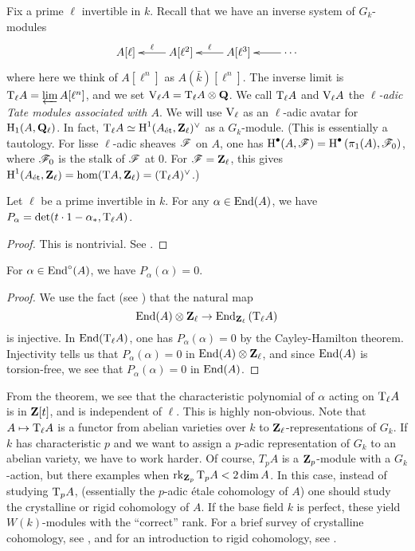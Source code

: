 Fix a prime $\ell$ invertible in $k$. Recall that we have an inverse system of 
$G_k$-modules 
\[\xymatrix{
  A[\ell] 
    & \ar[l]_-\ell A[\ell^2]
    & \ar[l]_-\ell A[\ell^3] 
    & \ar[l] \cdots
}\]
where here we think of $A[\ell^n]$ as $A(\bar k)[\ell^n]$. The inverse limit is 
$\mathrm{T}_\ell A=\varprojlim A[\ell^n]$, and we set 
$\mathrm{V}_\ell A=\mathrm{T}_\ell A\otimes \mathbf{Q}$. We call $\mathrm{T}_\ell A$ and 
$\mathrm{V}_\ell A$ the \emph{$\ell$-adic Tate modules associated with $A$}. We 
will use $\mathrm{V}_\ell$ as an $\ell$-adic avatar for 
$\operatorname{H}_1(A,\mathbf{Q}_\ell)$. In fact, $\mathrm{T}_\ell A\simeq \operatorname{H}^1({A}_\textnormal{\'et},\mathbf{Z}_\ell)^\vee$ as a 
$G_k$-module. (This is essentially a tautology. For lisse $\ell$-adic sheaves 
$\mathscr{F}$ on $A$, one has 
$\operatorname{H}^\bullet(A,\mathscr{F}) = \operatorname{H}^\bullet\left(\pi_1(A),\mathscr{F}_0\right)$, where $\mathscr{F}_0$ is 
the stalk of $\mathscr{F}$ at $0$. For $\mathscr{F}=\mathbf{Z}_\ell$, this gives 
$\operatorname{H}^1({A}_\textnormal{\'et},\mathbf{Z}_\ell) = \hom(\mathrm{T} A,\mathbf{Z}_\ell) = (\mathrm{T}_\ell A)^\vee$.)

\begin{theorem}
Let $\ell$ be a prime invertible in $k$. For any $\alpha\in \operatorname{End}(A)$, we have 
$P_\alpha = \det(t\cdot 1-\alpha_\ast,\mathrm{T}_\ell A)$. 
\end{theorem}
\begin{proof}
This is nontrivial. See \cite[I.10.20]{mi-av}. 
\end{proof}

\begin{corollary}
For $\alpha\in \operatorname{End}^\circ(A)$, we have $P_\alpha(\alpha)=0$. 
\end{corollary}
\begin{proof}
We use the fact (see \cite[I.10.15]{mi-av}) that the natural map 
\[
  \operatorname{End}(A)\otimes\mathbf{Z}_\ell \to \operatorname{End}_{\mathbf{Z}_\ell} \left(\mathrm{T}_\ell A\right)
\]
is injective. In $\operatorname{End}(\mathrm{T}_\ell A)$, one has $P_\alpha(\alpha)=0$ by the 
Cayley-Hamilton theorem. Injectivity tells us that 
$P_\alpha(\alpha)=0$ in $\operatorname{End}(A)\otimes\mathbf{Z}_\ell$, and since $\operatorname{End}(A)$ is 
torsion-free, we see that $P_\alpha(\alpha)=0$ in $\operatorname{End}(A)$.
\end{proof}

From the theorem, we see that the characteristic polynomial of $\alpha$ acting 
on $\mathrm{T}_\ell A$ is in $\mathbf{Z}[t]$, and is independent of $\ell$. This is highly 
non-obvious. Note that $A\mapsto \mathrm{T}_\ell A$ is a functor from abelian varieties 
over $k$ to $\mathbf{Z}_\ell$-representations of $G_k$. If $k$ has characteristic $p$ 
and we want to assign a $p$-adic representation of $G_k$ to an abelian variety, 
we have to work harder. Of course, $T_p A$ is a $\mathbf{Z}_p$-module with a 
$G_k$-action, but there examples when $\operatorname{rk}_{\mathbf{Z}_p} \mathrm{T}_p A < 2\dim A$. In this 
case, instead of studying $\mathrm{T}_p A$, (essentially the $p$-adic \'etale cohomology 
of $A$) one should study the crystalline or rigid cohomology of $A$. If the 
base field $k$ is perfect, these yield $W(k)$-modules with the ``correct'' 
rank. For a brief survey of crystalline cohomology, see \cite{il94}, and for an  
introduction to rigid cohomology, see \cite{st07}. 





